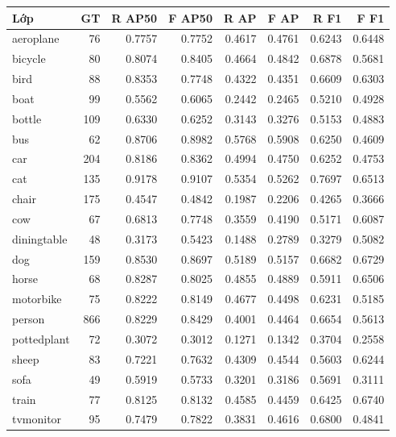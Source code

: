 \begin{tabular}{lrrrrrrr}
\toprule
Lớp & GT & R AP50 & F AP50 & R AP & F AP & R F1 & F F1\\
\midrule
aeroplane & 76 & 0.7757 & 0.7752 & 0.4617 & 0.4761 & 0.6243 & 0.6448\\
bicycle & 80 & 0.8074 & 0.8405 & 0.4664 & 0.4842 & 0.6878 & 0.5681\\
bird & 88 & 0.8353 & 0.7748 & 0.4322 & 0.4351 & 0.6609 & 0.6303\\
boat & 99 & 0.5562 & 0.6065 & 0.2442 & 0.2465 & 0.5210 & 0.4928\\
bottle & 109 & 0.6330 & 0.6252 & 0.3143 & 0.3276 & 0.5153 & 0.4883\\
bus & 62 & 0.8706 & 0.8982 & 0.5768 & 0.5908 & 0.6250 & 0.4609\\
car & 204 & 0.8186 & 0.8362 & 0.4994 & 0.4750 & 0.6252 & 0.4753\\
cat & 135 & 0.9178 & 0.9107 & 0.5354 & 0.5262 & 0.7697 & 0.6513\\
chair & 175 & 0.4547 & 0.4842 & 0.1987 & 0.2206 & 0.4265 & 0.3666\\
cow & 67 & 0.6813 & 0.7748 & 0.3559 & 0.4190 & 0.5171 & 0.6087\\
diningtable & 48 & 0.3173 & 0.5423 & 0.1488 & 0.2789 & 0.3279 & 0.5082\\
dog & 159 & 0.8530 & 0.8697 & 0.5189 & 0.5157 & 0.6682 & 0.6729\\
horse & 68 & 0.8287 & 0.8025 & 0.4855 & 0.4889 & 0.5911 & 0.6506\\
motorbike & 75 & 0.8222 & 0.8149 & 0.4677 & 0.4498 & 0.6231 & 0.5185\\
person & 866 & 0.8229 & 0.8429 & 0.4001 & 0.4464 & 0.6654 & 0.5613\\
pottedplant & 72 & 0.3072 & 0.3012 & 0.1271 & 0.1342 & 0.3704 & 0.2558\\
sheep & 83 & 0.7221 & 0.7632 & 0.4309 & 0.4544 & 0.5603 & 0.6244\\
sofa & 49 & 0.5919 & 0.5733 & 0.3201 & 0.3186 & 0.5691 & 0.3111\\
train & 77 & 0.8125 & 0.8132 & 0.4585 & 0.4459 & 0.6425 & 0.6740\\
tvmonitor & 95 & 0.7479 & 0.7822 & 0.3831 & 0.4616 & 0.6800 & 0.4841\\
\bottomrule
\end{tabular}
